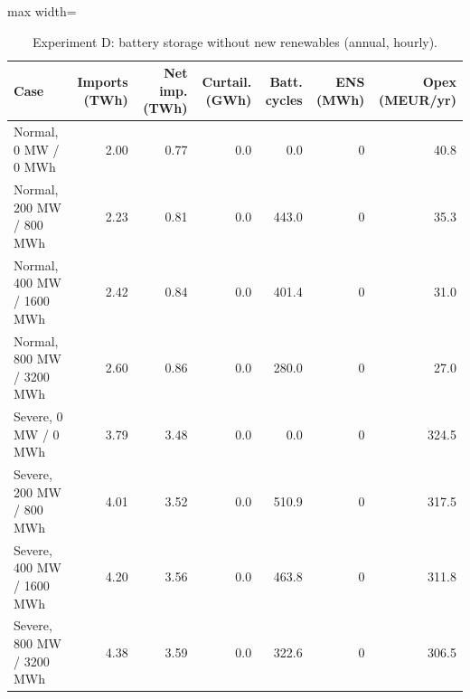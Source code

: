 \begin{table}[htbp]
\centering
\footnotesize
\caption{Experiment D: battery storage without new renewables (annual, hourly).}
\label{tab:exp-D}
\begin{adjustbox}{max width=\linewidth}
\begin{tabular}{lrrrrrr}
\toprule
Case & Imports (TWh) & Net imp. (TWh) & Curtail. (GWh) & Batt. cycles & ENS (MWh) & Opex (MEUR/yr) \\
\midrule
Normal, 0 MW / 0 MWh & 2.00 & 0.77 & 0.0 & 0.0 & 0 & 40.8 \\
Normal, 200 MW / 800 MWh & 2.23 & 0.81 & 0.0 & 443.0 & 0 & 35.3 \\
Normal, 400 MW / 1600 MWh & 2.42 & 0.84 & 0.0 & 401.4 & 0 & 31.0 \\
Normal, 800 MW / 3200 MWh & 2.60 & 0.86 & 0.0 & 280.0 & 0 & 27.0 \\
Severe, 0 MW / 0 MWh & 3.79 & 3.48 & 0.0 & 0.0 & 0 & 324.5 \\
Severe, 200 MW / 800 MWh & 4.01 & 3.52 & 0.0 & 510.9 & 0 & 317.5 \\
Severe, 400 MW / 1600 MWh & 4.20 & 3.56 & 0.0 & 463.8 & 0 & 311.8 \\
Severe, 800 MW / 3200 MWh & 4.38 & 3.59 & 0.0 & 322.6 & 0 & 306.5 \\
\bottomrule
\end{tabular}
\end{adjustbox}
\end{table}
